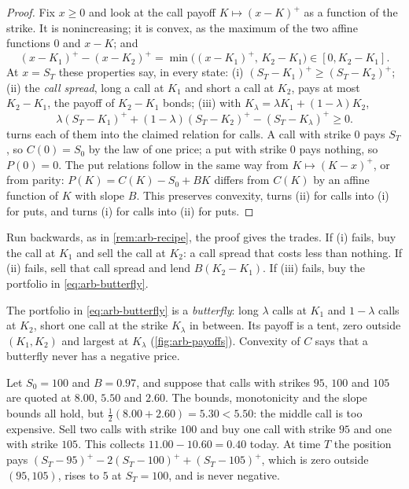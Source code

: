 \begin{proof}
Fix $x\ge0$ and look at the call payoff $K\mapsto(x-K)^+$ as a function of the strike. It is
nonincreasing; it is convex, as the maximum of the two affine functions $0$ and $x-K$; and
\begin{equation}\label{eq:arb-spread}
  (x-K_1)^+-(x-K_2)^+=\min\big((x-K_1)^+,\,K_2-K_1\big)\in[0,K_2-K_1] .
\end{equation}
At $x=S_T$ these properties say, in every state: (i) $(S_T-K_1)^+\ge(S_T-K_2)^+$; (ii) the
\emph{call spread}, long a call at $K_1$ and short a call at $K_2$, pays at most $K_2-K_1$,
the payoff of $K_2-K_1$ bonds; (iii) with $K_\lambda=\lambda K_1+(1-\lambda)K_2$,
\begin{equation}\label{eq:arb-butterfly}
  \lambda(S_T-K_1)^++(1-\lambda)(S_T-K_2)^+-(S_T-K_\lambda)^+\ge0 .
\end{equation}
 turns each of them into the claimed relation for calls. A call
with strike $0$ pays $S_T$, so $C(0)=S_0$ by the law of one price; a put with strike $0$
pays nothing, so $P(0)=0$. The put relations follow in the same way from
$K\mapsto(K-x)^+$, or from parity: $P(K)=C(K)-S_0+BK$ differs from $C(K)$ by an affine
function of $K$ with slope $B$. This preserves convexity, turns (ii) for calls into (i) for
puts, and turns (i) for calls into (ii) for puts.
\end{proof}

Run backwards, as in \cref{rem:arb-recipe}, the proof gives the trades. If (i) fails, buy
the call at $K_1$ and sell the call at $K_2$: a call spread that costs less than nothing. If
(ii) fails, sell that call spread and lend $B(K_2-K_1)$. If (iii) fails, buy the portfolio
in \eqref{eq:arb-butterfly}.

The portfolio in \eqref{eq:arb-butterfly} is a \emph{butterfly}: long $\lambda$ calls at
$K_1$ and $1-\lambda$ calls at $K_2$, short one call at the strike $K_\lambda$ in between.
Its payoff is a tent, zero outside $(K_1,K_2)$ and largest at $K_\lambda$
(\cref{fig:arb-payoffs}). Convexity of $C$ says that a butterfly never has a negative price.

\begin{example}\label{eg:arb-butterfly}
Let $S_0=100$ and $B=0.97$, and suppose that calls with strikes $95$, $100$ and $105$ are
quoted at $8.00$, $5.50$ and $2.60$. The bounds, monotonicity and the slope bounds all hold,
but $\frac12(8.00+2.60)=5.30<5.50$: the middle call is too expensive. Sell two calls with
strike $100$ and buy one call with strike $95$ and one with strike $105$. This collects
$11.00-10.60=0.40$ today. At time $T$ the position pays
$(S_T-95)^+-2(S_T-100)^++(S_T-105)^+$, which is zero outside $(95,105)$, rises to $5$ at
$S_T=100$, and is never negative.
\end{example}

